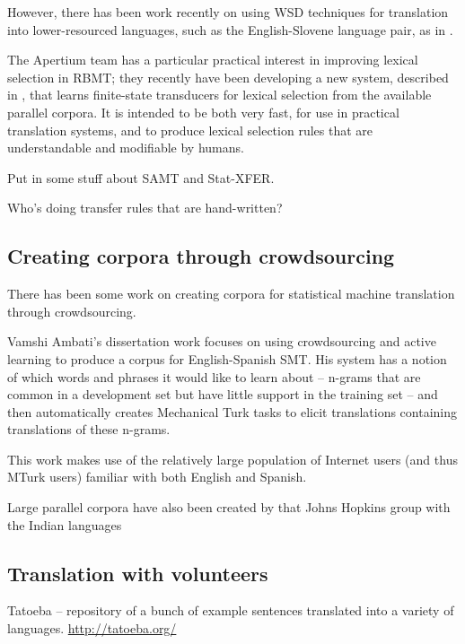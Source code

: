 However, there has been work recently on using WSD techniques for translation
into lower-resourced languages, such as the English-Slovene language pair, as
in \cite{vintar-fivser-vrvsvcaj:2012:ESIRMT-HyTra2012}. 

The Apertium team has a particular practical interest in improving lexical
selection in RBMT; they recently have been developing
a new system, described in \cite{tyers-fst}, that learns finite-state
transducers for lexical selection from the available parallel corpora. It is
intended to be both very fast, for use in practical translation systems, and
to produce lexical selection rules that are understandable and modifiable by
humans.

Put in some stuff about SAMT and Stat-XFER.

Who's doing transfer rules that are hand-written?

\subsection{Creating corpora through crowdsourcing}

There has been some work on creating corpora for statistical machine
translation through crowdsourcing.

Vamshi Ambati's dissertation work focuses on using crowdsourcing and active
learning to produce a corpus for English-Spanish SMT. His system has a notion
of which words and phrases it would like to learn about -- n-grams that are
common in a development set but have little support in the training set -- and
then automatically creates Mechanical Turk tasks to elicit translations
containing translations of these n-grams.

This work makes use of the relatively large population of Internet users (and
thus MTurk users) familiar with both English and Spanish.

\cite{ambati_naacl}

\cite{ambati_act}

Large parallel corpora have also been created by that Johns Hopkins group
with the Indian languages
\cite{post-callisonburch-osborne:2012:WMT}

\subsection{Translation with volunteers}

Tatoeba -- repository of a bunch of example sentences translated into a variety
of languages.
\url{http://tatoeba.org/}

